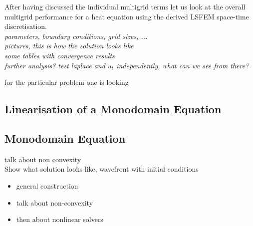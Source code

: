 \documentclass[../draft_1.tex]{subfiles}
\begin{document}
After having discussed the individual multigrid terms let us look at the overall multigrid performance for a heat equation using the derived LSFEM space-time discretisation. 
\bigskip
\\
\textit{parameters, boundary conditions, grid sizes, ...}
\bigskip
\\
\textit{pictures, this is how the solution looks like}
\bigskip
\\
\textit{some tables with convergence results}
\bigskip
\\
\textit{further analysis? test laplace and $u_t$ independently, what can we see from there?}




 for the particular problem one is looking 

\subsection{Linearisation of a Monodomain Equation}


\subsection{Monodomain Equation}


talk about non convexity \\
Show what solution looks like, wavefront with initial conditions \\


\begin{itemize}
	\item general construction
	\item talk about non-convexity 
	\item then about nonlinear solvers
	
\end{itemize}
\end{document}
